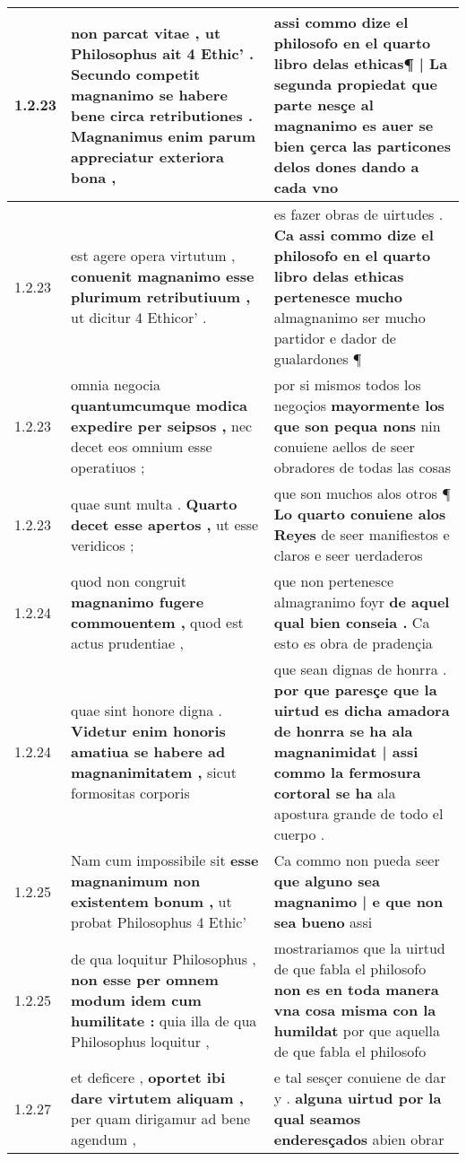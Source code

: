 \begin{tabular}{|p{1cm}|p{6.5cm}|p{6.5cm}|}
1.2.23 & non parcat vitae , \textbf{ ut Philosophus ait 4 Ethic’ . Secundo competit magnanimo se habere bene circa retributiones . } Magnanimus enim parum appreciatur exteriora bona , & assi commo dize el philosofo \textbf{ en el quarto libro delas ethicas¶ | La segunda propiedat que parte nesçe al magnanimo es } auer se bien çerca las particones delos dones dando a cada vno \\\hline
1.2.23 & est agere opera virtutum , \textbf{ conuenit magnanimo esse plurimum retributiuum , } ut dicitur 4 Ethicor’ . & es fazer obras de uirtudes . \textbf{ Ca assi commo dize el philosofo en el quarto libro delas ethicas pertenesce mucho } almagnanimo ser mucho partidor e dador de gualardones ¶ \\\hline
1.2.23 & omnia negocia \textbf{ quantumcumque modica expedire per seipsos , } nec decet eos omnium esse operatiuos ; & por si mismos todos los negoçios \textbf{ mayormente los que son pequa nons } nin conuiene aellos de seer obradores de todas las cosas \\\hline
1.2.23 & quae sunt multa . \textbf{ Quarto decet esse apertos , } ut esse veridicos ; & que son muchos alos otros ¶ \textbf{ Lo quarto conuiene alos Reyes } de seer manifiestos e claros e seer uerdaderos \\\hline
1.2.24 & quod non congruit \textbf{ magnanimo fugere commouentem , } quod est actus prudentiae , & que non pertenesce almagranimo foyr \textbf{ de aquel qual bien conseia . } Ca esto es obra de pradençia \\\hline
1.2.24 & quae sint honore digna . \textbf{ Videtur enim honoris amatiua se habere ad magnanimitatem , } sicut formositas corporis & que sean dignas de honrra . \textbf{ por que paresçe que la uirtud es dicha amadora de honrra se ha ala magnanimidat | assi commo la fermosura cortoral se ha } ala apostura grande de todo el cuerpo . \\\hline
1.2.25 & Nam cum impossibile sit \textbf{ esse magnanimum non existentem bonum , } ut probat Philosophus 4 Ethic’ & Ca commo non pueda seer \textbf{ que alguno sea magnanimo | e que non sea bueno } assi \\\hline
1.2.25 & de qua loquitur Philosophus , \textbf{ non esse per omnem modum idem cum humilitate : } quia illa de qua Philosophus loquitur , & mostrariamos que la uirtud de que fabla el philosofo \textbf{ non es en toda manera vna cosa misma con la humildat } por que aquella de que fabla el philosofo \\\hline
1.2.27 & et deficere , \textbf{ oportet ibi dare virtutem aliquam , } per quam dirigamur ad bene agendum , & e tal sesçer conuiene de dar y . \textbf{ alguna uirtud por la qual seamos enderesçados } abien obrar \\\hline

\end{tabular}
